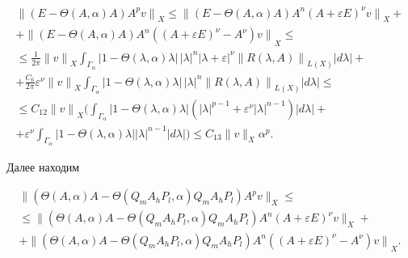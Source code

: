 \begin{multline}


{\| (E-\Theta( A,\alpha) A) A^p v \|}_X \leq


{\| (E-\Theta( A,\alpha) A) A^n {(A+ \varepsilon E)}^{\nu} v \|}_X +\\


%


+ {\| (E-\Theta( A,\alpha) A) A^n ({(A+ \varepsilon E)}^{\nu}-A^{\nu})


v \|}_X \leq \\


%


\leq \frac{1}{2 \pi} {\| v \|}_X \int _{\Gamma_{\alpha}}


| 1-\Theta(\lambda, \alpha) \lambda |\, {| \lambda |}^n


{| \lambda + \varepsilon |}^{\nu}


{\| R(\lambda, A) \|}_{L(X)} | d \lambda | + \\


%


+ \frac{C_6}{2 \pi} {\varepsilon}^{\nu} {\| v \|}_X


\int_{\Gamma_{\alpha}}


| 1-\Theta(\lambda, \alpha) \lambda |\, {| \lambda |}^n


{\| R(\lambda, A) \|}_{L(X)} | d \lambda | \leq \\


%


\leq C_{12} {\| v \|}_X \bigg( \int_{\Gamma_{\alpha}}


| 1-\Theta(\lambda, \alpha) \lambda |


({| \lambda |}^{p-1} + {\varepsilon}^{\nu}{| \lambda


|}^{n-1}) | d \lambda | + \\


%


+ {\varepsilon}^{\nu} \int_{\Gamma_{\alpha}}


| 1-\Theta(\lambda, \alpha) \lambda |


{| \lambda |}^{n-1} | d \lambda | \bigg) \leq


C_{13}\| v \|_X {\alpha}^p.


\tag{3.11}


\end{multline}


Далее находим


\begin{multline}


\| ( \Theta( A, \alpha) A- \Theta(Q_m A_h P_l, \alpha) Q_m A_h P_l)


A^p v {\|_X} \leq \\


\leq \| ( \Theta( A, \alpha) A- \Theta(Q_m A_h P_l, \alpha) Q_m A_h P_l)


A^n {(A+ \varepsilon E)}^{\nu} v {\|_X} + \\


+{\| ( \Theta( A, \alpha) A- \Theta(Q_m A_h P_l, \alpha) Q_m A_h P_l)


A^n ({(A+ \varepsilon E)}^{\nu}- A^{\nu}) v \|}_X.


\tag{3.12}


\end{multline}


